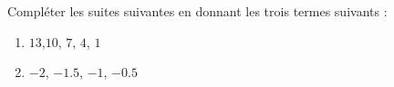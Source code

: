 
\begin{exercice}\label{exo2smath-0083}

    Compléter les suites suivantes en donnant les trois termes suivants :
    \begin{enumerate}
        \item
            \( 13\),\(10 \), \( 7\), \( 4\), \( 1\)
        \item
            \( -2\), \( -1.5\), \( -1\), \( -0.5\)
    \end{enumerate}

\end{exercice}
